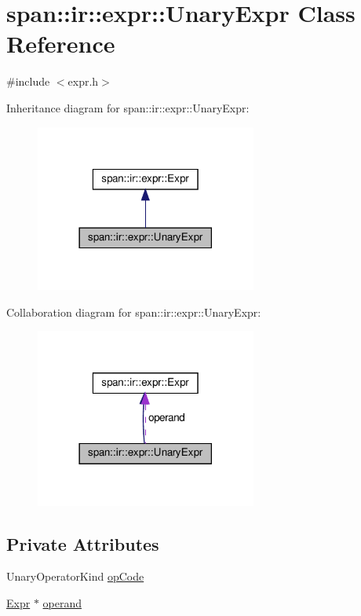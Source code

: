 \hypertarget{classspan_1_1ir_1_1expr_1_1UnaryExpr}{}\section{span\+:\+:ir\+:\+:expr\+:\+:Unary\+Expr Class Reference}
\label{classspan_1_1ir_1_1expr_1_1UnaryExpr}


{\ttfamily \#include $<$expr.\+h$>$}



Inheritance diagram for span\+:\+:ir\+:\+:expr\+:\+:Unary\+Expr\+:\nopagebreak
\begin{figure}[H]
\begin{center}
\leavevmode
\includegraphics[width=206pt]{classspan_1_1ir_1_1expr_1_1UnaryExpr__inherit__graph}
\end{center}
\end{figure}


Collaboration diagram for span\+:\+:ir\+:\+:expr\+:\+:Unary\+Expr\+:\nopagebreak
\begin{figure}[H]
\begin{center}
\leavevmode
\includegraphics[width=206pt]{classspan_1_1ir_1_1expr_1_1UnaryExpr__coll__graph}
\end{center}
\end{figure}
\subsection*{Private Attributes}
\begin{DoxyCompactItemize}
\item 
Unary\+Operator\+Kind \hyperlink{classspan_1_1ir_1_1expr_1_1UnaryExpr_aac781e22585159b2281042a2ba22c882}{op\+Code}
\item 
\hyperlink{classspan_1_1ir_1_1expr_1_1Expr}{Expr} $\ast$ \hyperlink{classspan_1_1ir_1_1expr_1_1UnaryExpr_a2b35e140d5863c177c995e4f94f8f1b9}{operand}
\end{DoxyCompactItemize}


